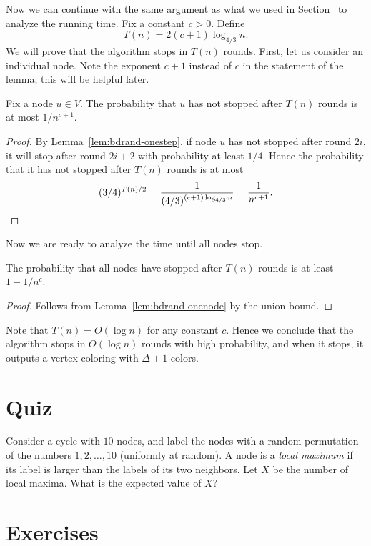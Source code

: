 Now we can continue with the same argument as what we used in Section~ to analyze the running time. Fix a constant $c > 0$. Define
\[
    T(n) = 2(c+1) \log_{4/3} n.
\]
We will prove that the algorithm stops in $T(n)$ rounds. First, let us consider an individual node. Note the exponent $c+1$ instead of $c$ in the statement of the lemma; this will be helpful later.

\begin{lemma}\label{lem:bdrand-onenode}
    Fix a node $u \in V$. The probability that $u$ has not stopped after $T(n)$ rounds is at most $1/n^{c+1}$.
\end{lemma}
\begin{proof}
    By Lemma~\ref{lem:bdrand-onestep}, if node $u$ has not stopped after round $2i$, it will stop after round $2i+2$ with probability at least $1/4$. Hence the probability that it has not stopped after $T(n)$ rounds is at most
    \[
        (3/4)^{T(n)/2} = \frac{1}{(4/3)^{(c+1) \log_{4/3} n}} = \frac{1}{n^{c+1}}. \qedhere
    \]
\end{proof}

Now we are ready to analyze the time until all nodes stop.

\begin{theorem}\label{thm:bdrand}
    The probability that all nodes have stopped after $T(n)$ rounds is at least $1 - 1/n^c$.
\end{theorem}
\begin{proof}
    Follows from Lemma~\ref{lem:bdrand-onenode} by the union bound.
\end{proof}

Note that $T(n) = O(\log n)$ for any constant $c$. Hence we conclude that the algorithm stops in $O(\log n)$ rounds with high probability, and when it stops, it outputs a vertex coloring with $\Delta+1$ colors.


\section{Quiz}

Consider a cycle with $10$ nodes, and label the nodes with a random permutation of the numbers $1, 2, \dotsc, 10$ (uniformly at random). A node is a \emph{local maximum} if its label is larger than the labels of its two neighbors. Let $X$ be the number of local maxima. What is the expected value of $X$?

\section{Exercises}

